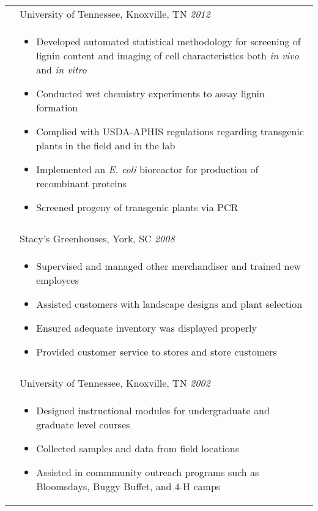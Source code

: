 \documentclass[10pt]{article}
\begin{document}
\begin{minipage}[ht]{.75\linewidth}
\begin{tabularx}{\linewidth}{p{1.8cm}M}
       & University of Tennessee, Knoxville, TN \textit{2012 } \\
       & \begin{itemize}[topsep=-12pt,parsep=0em]
            \setlength\itemsep{0em}
            \item Developed automated statistical methodology for screening of lignin content and imaging of cell characteristics both \textit{in vivo} and \textit{in vitro}
            \item Conducted wet chemistry experiments to assay lignin formation
            \item Complied with USDA-APHIS regulations regarding transgenic plants in the field and in the lab
            \item Implemented an \textit{E. coli} bioreactor for production of recombinant proteins
            \item Screened progeny of transgenic plants via PCR
         \end{itemize} \\
      &  \\
      & Stacy's Greenhouses, York, SC \textit{2008 } \\
      &
         \begin{itemize}[topsep=-12pt,parsep=0em]
           \setlength\itemsep{0em}
           \item Supervised and managed other merchandiser and trained new employees
           \item Assisted customers with landscape designs and plant selection
           \item Ensured adequate inventory was displayed properly
           \item Provided customer service to stores and store customers
         \end{itemize} \\
      &  \\
      & University of Tennessee, Knoxville, TN \textit{2002 } \\
      & \begin{itemize}[topsep=-12pt,parsep=0em]
           \setlength\itemsep{0em}
           \item Designed instructional modules for undergraduate and graduate level courses
           \item Collected samples and data from field locations
           \item Assisted in commmunity outreach programs such as Bloomsdays, Buggy Buffet, and 4-H camps
        \end{itemize} \\
   \end{tabularx}
   \egroup
\end{minipage}
\end{document}
